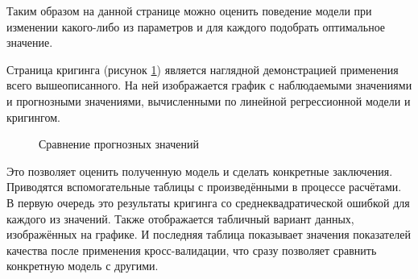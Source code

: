 Таким образом на данной странице можно оценить поведение модели при изменении какого-либо из параметров и для каждого подобрать оптимальное значение.

Страница кригинга (рисунок \ref{img:mod_krige}) является наглядной демонстрацией применения всего вышеописанного. На ней изображается график с наблюдаемыми значениями и прогнозными значениями, вычисленными по линейной регрессионной модели и кригингом.
\begin{figure}[ht]
\caption{Сравнение прогнозных значений}
\label{img:mod_krige}
\end{figure}
Это позволяет оценить полученную модель и сделать конкретные заключения. Приводятся вспомогательные таблицы с произведёнными в процессе расчётами. В первую очередь это результаты кригинга со среднеквадратической ошибкой для каждого из значений. Также отображается табличный вариант данных, изображённых на графике. И последняя таблица показывает значения показателей качества после применения кросс-валидации, что сразу позволяет сравнить конкретную модель с другими.

